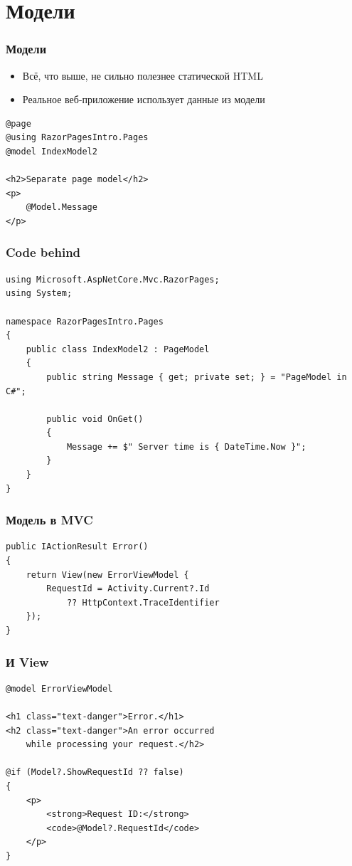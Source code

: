 \documentclass{../../slides-style}
\begin{document}
    \section{Модели}

    \begin{frame}[fragile]
        \frametitle{Модели}
        \begin{itemize}
            \item Всё, что выше, не сильно полезнее статической HTML
            \item Реальное веб-приложение использует данные из модели
        \end{itemize}
        \begin{verbatim}
@page
@using RazorPagesIntro.Pages
@model IndexModel2

<h2>Separate page model</h2>
<p>
    @Model.Message
</p>
        \end{verbatim}
    \end{frame}

    \begin{frame}[fragile]
        \frametitle{Code behind}
        \begin{small}
            \begin{verbatim}
using Microsoft.AspNetCore.Mvc.RazorPages;
using System;

namespace RazorPagesIntro.Pages
{
    public class IndexModel2 : PageModel
    {
        public string Message { get; private set; } = "PageModel in C#";

        public void OnGet()
        {
            Message += $" Server time is { DateTime.Now }";
        }
    }
}
            \end{verbatim}
        \end{small}
    \end{frame}

    \begin{frame}[fragile]
        \frametitle{Модель в MVC}
        \begin{verbatim}
public IActionResult Error()
{
    return View(new ErrorViewModel { 
        RequestId = Activity.Current?.Id 
            ?? HttpContext.TraceIdentifier 
    });
}
        \end{verbatim}
    \end{frame}

    \begin{frame}[fragile]
        \frametitle{И View}
        \begin{verbatim}
@model ErrorViewModel

<h1 class="text-danger">Error.</h1>
<h2 class="text-danger">An error occurred 
    while processing your request.</h2>

@if (Model?.ShowRequestId ?? false)
{
    <p>
        <strong>Request ID:</strong> 
        <code>@Model?.RequestId</code>
    </p>
}
        \end{verbatim}
    \end{frame}
\end{document}
